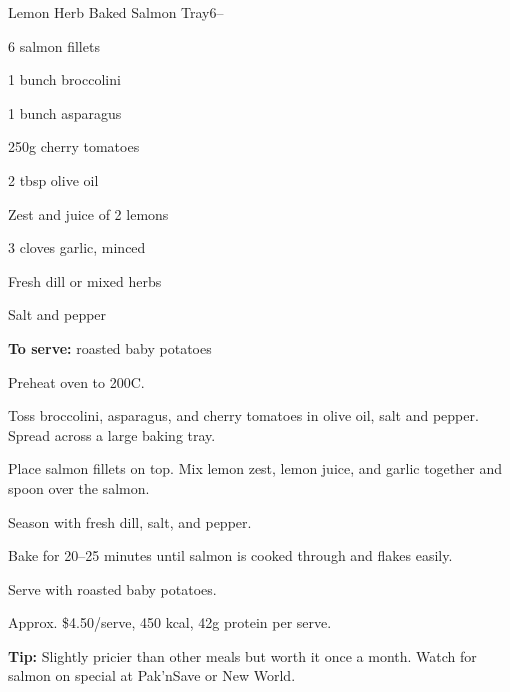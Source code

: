\begin{recipebox}{Lemon Herb Baked Salmon Tray}{6}{--}
\begin{ingredients}
  \item 6 salmon fillets
  \item 1 bunch broccolini
  \item 1 bunch asparagus
  \item 250g cherry tomatoes
  \item 2 tbsp olive oil
  \item Zest and juice of 2 lemons
  \item 3 cloves garlic, minced
  \item Fresh dill or mixed herbs
  \item Salt and pepper
  \item \textbf{To serve:} roasted baby potatoes
\end{ingredients}

\begin{method}
  \item Preheat oven to 200\textdegree C.
  \item Toss broccolini, asparagus, and cherry tomatoes in olive oil, salt and pepper. Spread across a large baking tray.
  \item Place salmon fillets on top. Mix lemon zest, lemon juice, and garlic together and spoon over the salmon.
  \item Season with fresh dill, salt, and pepper.
  \item Bake for 20--25 minutes until salmon is cooked through and flakes easily.
  \item Serve with roasted baby potatoes.
\end{method}

\begin{notelist}
  \item Approx. \$4.50/serve, 450 kcal, 42g protein per serve.
  \item \textbf{Tip:} Slightly pricier than other meals but worth it once a month. Watch for salmon on special at Pak'nSave or New World.
\end{notelist}
\end{recipebox}
